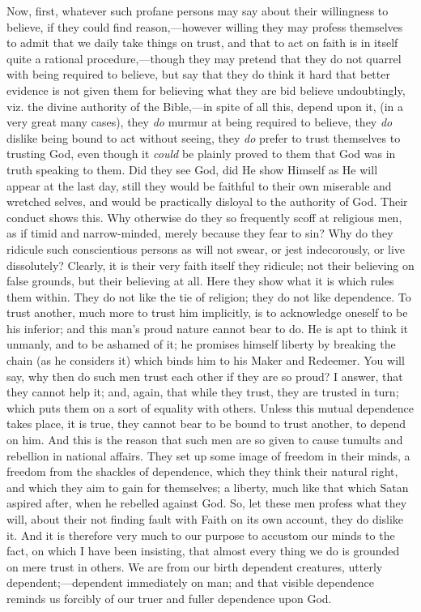 Now, first, whatever such profane persons may say about their willingness to believe, if they could find
reason,—however willing they may profess themselves
to admit that we daily take things on trust, and that to
act on faith is in itself quite a rational
procedure,—though they may pretend that they do not
quarrel with being required to believe, but say that they
do think it hard that better evidence is not given them
for believing what they are bid believe undoubtingly,
viz. the divine authority of the Bible,—in spite of
all this, depend upon it, (in a very great many cases),
they \emph{do} murmur at being required to believe, they \emph{do}
dislike being bound to act without seeing, they \emph{do}
prefer to trust themselves to trusting God, even though
it \emph{could} be plainly proved to them that God was in
truth speaking to them. Did they see God, did He show
Himself as He will appear at the last day, still they
would be faithful to their own miserable and wretched
selves, and would be practically disloyal to the
authority of God. Their conduct shows this. Why otherwise
do they so frequently scoff at religious men, as if timid
and narrow-minded, merely because they fear to sin? Why
do they ridicule such conscientious persons as will not
swear, or jest indecorously, or live dissolutely?
Clearly, it is their very faith itself they ridicule; not
their believing on false grounds, but their believing at
all. Here they show what it is which rules them within.
They do not like the tie of religion; they do not like
dependence. To trust another, much more to trust him
implicitly, is to acknowledge oneself to be his inferior;
and this man's proud nature cannot bear to do. He is apt
to think it unmanly, and to be ashamed of it; he promises
himself liberty by breaking the chain (as he considers
it) which binds him to his Maker and Redeemer. You will
say, why then do such men trust each other if they are so
proud? I answer, that they cannot help it; and, again,
that while they trust, they are trusted in turn; which
puts them on a sort of equality with others. Unless this
mutual dependence takes place, it is true, they cannot
bear to be bound to trust another, to depend on him. And
this is the reason that such men are so given to cause
tumults and rebellion in national affairs. They set up
some image of freedom in their minds, a freedom from the
shackles of dependence, which they think their natural
right, and which they aim to gain for themselves; a
liberty, much like that which Satan aspired after, when
he rebelled against God. So, let these men profess what
they will, about their not finding fault with Faith on
its own account, they do dislike it. And it is therefore
very much to our purpose to accustom our minds to the
fact, on which I have been insisting, that almost every
thing we do is grounded on mere trust in others. We are
from our birth dependent creatures, utterly
dependent;—dependent immediately on man; and that
visible dependence reminds us forcibly of our truer and
fuller dependence upon God.

